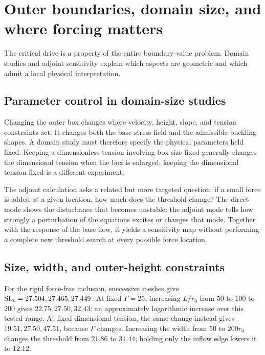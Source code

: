 

\section{Outer boundaries, domain size, and where forcing matters}\label{sec:geometry}
The critical drive is a property of the entire boundary-value problem. Domain studies and adjoint sensitivity explain which aspects are geometric and which admit a local physical interpretation.


\subsection{Parameter control in domain-size studies}
Changing the outer box changes where velocity, height, slope, and tension constraints act. It changes both the base stress field and the admissible buckling shapes. A domain study must therefore specify the physical parameters held fixed. Keeping a dimensionless tension involving box size fixed generally changes the dimensional tension when the box is enlarged; keeping the dimensional tension fixed is a different experiment.

The adjoint calculation asks a related but more targeted question: if a small force is added at a given location, how much does the threshold change? The direct mode shows the disturbance that becomes unstable; the adjoint mode tells how strongly a perturbation of the equations excites or changes that mode. Together with the response of the base flow, it yields a sensitivity map without performing a complete new threshold search at every possible force location.


\subsection{Size, width, and outer-height constraints}


For the rigid force-free inclusion, successive meshes give $\mathrm{SL}_c=27.504,27.465,27.449$. At fixed $\Gamma=25$, increasing $L/r_0$ from $50$ to $100$ to $200$ gives $22.75,27.50,32.43$: an approximately logarithmic increase over this tested range. At fixed dimensional tension, the same change instead gives $19.51,27.50,47.51$, because $\Gamma$ changes. Increasing the width from $50$ to $200r_0$ changes the threshold from $21.86$ to $31.44$; holding only the inflow edge lowers it to $12.12$.

